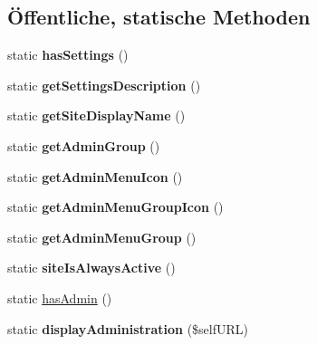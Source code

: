 \subsection*{Öffentliche, statische Methoden}
\begin{DoxyCompactItemize}
\item 
\mbox{\label{class_admin_mail_settings_a14019b8b0f3a09567c81ac9cd71d06f0}} 
static {\bfseries has\+Settings} ()
\item 
\mbox{\label{class_admin_mail_settings_ace7c9a38cabf1dcdba2ba01364f9f5da}} 
static {\bfseries get\+Settings\+Description} ()
\item 
\mbox{\label{class_admin_mail_settings_a3453fc6a0a874216ce83c78b327f0c79}} 
static {\bfseries get\+Site\+Display\+Name} ()
\item 
\mbox{\label{class_admin_mail_settings_a3027406f00a5b76ab0df7dcdaa683d12}} 
static {\bfseries get\+Admin\+Group} ()
\item 
\mbox{\label{class_admin_mail_settings_a2d8a421901332f804bc12f2933e9f045}} 
static {\bfseries get\+Admin\+Menu\+Icon} ()
\item 
\mbox{\label{class_admin_mail_settings_a8bedd2e7c66ea36fb61db9add9db96bb}} 
static {\bfseries get\+Admin\+Menu\+Group\+Icon} ()
\item 
\mbox{\label{class_admin_mail_settings_a02a62a2dda7aea588e66f6e4b868151a}} 
static {\bfseries get\+Admin\+Menu\+Group} ()
\item 
\mbox{\label{class_admin_mail_settings_a74ddff731a8e7f0858a6fd22680a345e}} 
static {\bfseries site\+Is\+Always\+Active} ()
\item 
static \mbox{\hyperlink{class_admin_mail_settings_a32815d3eac3e460e41db19e60fbc0bca}{has\+Admin}} ()
\item 
\mbox{\label{class_admin_mail_settings_a1cfef9f0888712f59d629128a69d2045}} 
static {\bfseries display\+Administration} (\$self\+U\+RL)
\end{DoxyCompactItemize}
